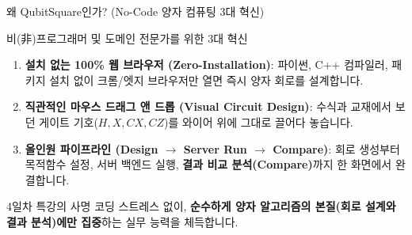 \documentclass[aspectratio=169, 10pt]{beamer}
\begin{document}
\begin{frame}{왜 QubitSquare인가? (No-Code 양자 컴퓨팅 3대 혁신)}
    \begin{qcblock}{비(非)프로그래머 및 도메인 전문가를 위한 3대 혁신}
        \begin{enumerate}
            \item \textbf{설치 없는 100\% 웹 브라우저 (Zero-Installation)}:
            파이썬, C++ 컴파일러, 패키지 설치 없이 크롬/엣지 브라우저만 열면 즉시 양자 회로를 설계합니다.
            \pause
            \item \textbf{직관적인 마우스 드래그 앤 드롭 (Visual Circuit Design)}:
            수식과 교재에서 보던 게이트 기호($H, X, CX, CZ$)를 와이어 위에 그대로 끌어다 놓습니다.
            \pause
            \item \textbf{올인원 파이프라인 (Design $\to$ Server Run $\to$ Compare)}:
            회로 생성부터 목적함수 설정, 서버 백엔드 실행, \textbf{결과 비교 분석(Compare)}까지 한 화면에서 완결합니다.
        \end{enumerate}
    \end{qcblock}
    \vspace{0.2cm}
    \begin{qctip}{4일차 특강의 사명}
        코딩 스트레스 없이, \textbf{순수하게 양자 알고리즘의 본질(회로 설계와 결과 분석)에만 집중}하는 실무 능력을 체득합니다.
    \end{qctip}
\end{frame}
\end{document}
